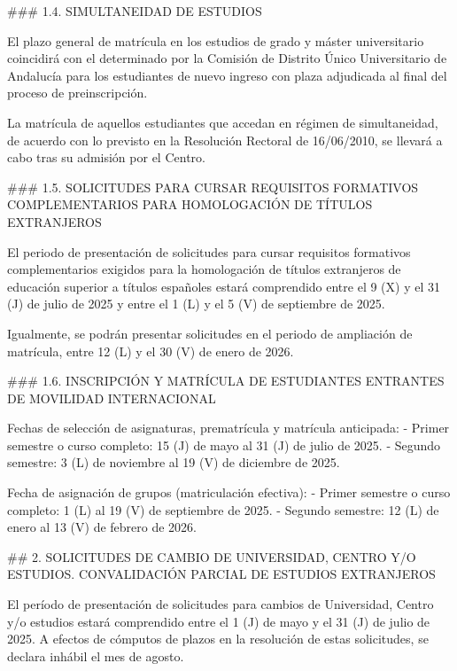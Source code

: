 \documentclass{article}
\begin{document}
\begin{itemize}
\begin{itemize}
\begin{scriptsize}
                  \#\#\# 1.4. SIMULTANEIDAD DE ESTUDIOS

                  El plazo general de matrícula en los estudios de grado y máster universitario coincidirá con el determinado por la Comisión de Distrito Único Universitario de Andalucía para los estudiantes de nuevo ingreso con plaza adjudicada al final del proceso de preinscripción.

                  La matrícula de aquellos estudiantes que accedan en régimen de simultaneidad, de acuerdo con lo previsto en la Resolución Rectoral de 16/06/2010, se llevará a cabo tras su admisión por el Centro.

                  \#\#\# 1.5. SOLICITUDES PARA CURSAR REQUISITOS FORMATIVOS COMPLEMENTARIOS PARA HOMOLOGACIÓN DE TÍTULOS EXTRANJEROS

                  El periodo de presentación de solicitudes para cursar requisitos formativos complementarios exigidos para la homologación de títulos extranjeros de educación superior a títulos españoles estará comprendido entre el 9 (X) y el 31 (J) de julio de 2025 y entre el 1 (L) y el 5 (V) de septiembre de 2025.

                  Igualmente, se podrán presentar solicitudes en el periodo de ampliación de matrícula, entre 12 (L) y el 30 (V) de enero de 2026.

                  \#\#\# 1.6. INSCRIPCIÓN Y MATRÍCULA DE ESTUDIANTES ENTRANTES DE MOVILIDAD INTERNACIONAL

                  Fechas de selección de asignaturas, prematrícula y matrícula anticipada:
                  - Primer semestre o curso completo: 15 (J) de mayo al 31 (J) de julio de 2025.
                  - Segundo semestre: 3 (L) de noviembre al 19 (V) de diciembre de 2025.

                  Fecha de asignación de grupos (matriculación efectiva):
                  - Primer semestre o curso completo: 1 (L) al 19 (V) de septiembre de 2025.
                  - Segundo semestre: 12 (L) de enero al 13 (V) de febrero de 2026.

                  \#\# 2. SOLICITUDES DE CAMBIO DE UNIVERSIDAD, CENTRO Y/O ESTUDIOS. CONVALIDACIÓN PARCIAL DE ESTUDIOS EXTRANJEROS

                  El período de presentación de solicitudes para cambios de Universidad, Centro y/o estudios estará comprendido entre el 1 (J) de mayo y el 31 (J) de julio de 2025. A efectos de cómputos de plazos en la resolución de estas solicitudes, se declara inhábil el mes de agosto.


\end{scriptsize}
\end{itemize}
\end{itemize}
\end{document}
